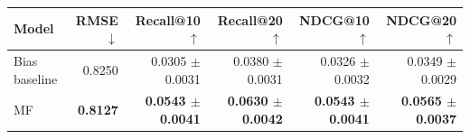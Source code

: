 \begin{tabular}{lrrrrr}
\toprule
Model & RMSE $\downarrow$ & Recall@10 $\uparrow$ & Recall@20 $\uparrow$ & NDCG@10 $\uparrow$ & NDCG@20 $\uparrow$ \\
\midrule
Bias baseline & 0.8250 & 0.0305 $\pm$ 0.0031 & 0.0380 $\pm$ 0.0031 & 0.0326 $\pm$ 0.0032 & 0.0349 $\pm$ 0.0029 \\
MF & \textbf{0.8127} & \textbf{0.0543 $\pm$ 0.0041} & \textbf{0.0630 $\pm$ 0.0042} & \textbf{0.0543 $\pm$ 0.0041} & \textbf{0.0565 $\pm$ 0.0037} \\
\bottomrule
\end{tabular}
